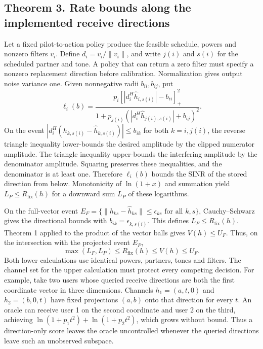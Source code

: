 \documentclass[10pt,letterpaper]{article}
\begin{document}
\subsection{Theorem 3. Rate bounds along the implemented receive directions}
Let a fixed pilot-to-action policy produce the feasible schedule, powers and nonzero filters $v_i$. Define $d_i=v_i/\|v_i\|$, and write $j(i)$ and $s(i)$ for the scheduled partner and tone. A policy that can return a zero filter must specify a nonzero replacement direction before calibration. Normalization gives output noise variance one. Given nonnegative radii $b_{ii},b_{ij}$, put
\begin{equation}
 \ell_i(b)=\frac{p_i[|d_i^H\hat h_{i,s(i)}|-b_{ii}]_+^2}
 {1+p_{j(i)}(|d_i^H\hat h_{j(i),s(i)}|+b_{ij})^2}.
 \label{supp:directional-lower}
\end{equation}
On the event $|d_i^H(h_{k,s(i)}-\hat h_{k,s(i)})|\le b_{ik}$ for both $k=i,j(i)$, the reverse triangle inequality lower-bounds the desired amplitude by the clipped numerator amplitude. The triangle inequality upper-bounds the interfering amplitude by the denominator amplitude. Squaring preserves these inequalities, and the denominator is at least one. Therefore $\ell_i(b)$ bounds the SINR of the stored direction from below. Monotonicity of $\ln(1+x)$ and summation yield $L_P\le R_{\mathrm{fix}}(h)$ for a downward sum $L_P$ of these logarithms.

On the full-vector event $E_F=\{\|h_{ks}-\hat h_{ks}\|\le\epsilon_{ks}\text{ for all }k,s\}$, Cauchy--Schwarz gives the directional bounds with $b_{ik}=\epsilon_{k,s(i)}$. This defines $L_F\le R_{\mathrm{fix}}(h)$. Theorem 1 applied to the product of the vector balls gives $V(h)\le U_F$. Thus, on the intersection with the projected event $E_P$,
\begin{equation}
 \max(L_F,L_P)\le R_{\mathrm{fix}}(h)\le V(h)\le U_F.
 \label{supp:theorem3}
\end{equation}
Both lower calculations use identical powers, partners, tones and filters. The channel set for the upper calculation must protect every competing decision. For example, take two users whose queried receive directions are both the first coordinate vector in three dimensions. Channels $h_1=(a,t,0)$ and $h_2=(b,0,t)$ have fixed projections $(a,b)$ onto that direction for every $t$. An oracle can receive user 1 on the second coordinate and user 2 on the third, achieving $\ln(1+p_1t^2)+\ln(1+p_2t^2)$, which grows without bound. Thus a direction-only score leaves the oracle uncontrolled whenever the queried directions leave such an unobserved subspace.
\end{document}
